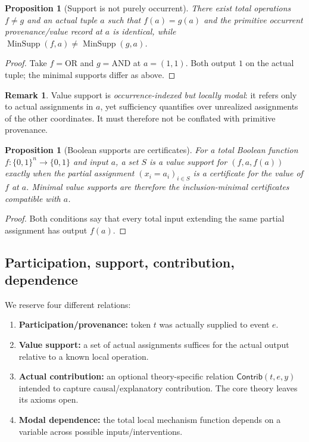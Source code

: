 \documentclass[11pt,a4paper]{article}
\theoremstyle{clean}
\newtheorem{proposition}[theorem]{Proposition}
\theoremstyle{definition}
\newtheorem{remark}[theorem]{Remark}
\newcommand{\MinSupp}{\operatorname{MinSupp}}
\begin{document}
\begin{proposition}[Support is not purely occurrent]
There exist total operations $f\neq g$ and an actual tuple $a$ such that $f(a)=g(a)$ and the primitive occurrent provenance/value record at $a$ is identical, while $\MinSupp(f,a)\neq\MinSupp(g,a)$.
\end{proposition}
\begin{proof}
Take $f=\mathrm{OR}$ and $g=\mathrm{AND}$ at $a=(1,1)$. Both output $1$ on the actual tuple; the minimal supports differ as above.
\end{proof}

\begin{remark}
Value support is \emph{occurrence-indexed but locally modal}: it refers only to actual assignments in $a$, yet sufficiency quantifies over unrealized assignments of the other coordinates. It must therefore not be conflated with primitive provenance.
\end{remark}

\begin{proposition}[Boolean supports are certificates]
For a total Boolean function $f:\{0,1\}^n\to\{0,1\}$ and input $a$, a set $S$ is a value support for $(f,a,f(a))$ exactly when the partial assignment $(x_i=a_i)_{i\in S}$ is a certificate for the value of $f$ at $a$. Minimal value supports are therefore the inclusion-minimal certificates compatible with $a$.
\end{proposition}
\begin{proof}
Both conditions say that every total input extending the same partial assignment has output $f(a)$.
\end{proof}

\subsection{Participation, support, contribution, dependence}

We reserve four different relations:
\begin{enumerate}
  \item \textbf{Participation/provenance:} token $t$ was actually supplied to event $e$.
  \item \textbf{Value support:} a set of actual assignments suffices for the actual output relative to a known local operation.
  \item \textbf{Actual contribution:} an optional theory-specific relation $\mathsf{Contrib}(t,e,y)$ intended to capture causal/explanatory contribution. The core theory leaves its axioms open.
  \item \textbf{Modal dependence:} the total local mechanism function depends on a variable across possible inputs/interventions.
\end{enumerate}
\end{document}
